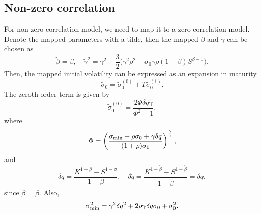 \documentclass[12pt]{article}
\begin{document}
  \subsection{Non-zero correlation}

    For non-zero correlation model, we need to map it to a zero correlation model. Denote the mapped parameters with a tilde,
    then the mapped $\beta$ and $\gamma$ can be chosen as
    \begin{equation}
      \tilde{\beta} = \beta, \quad
      \tilde{\gamma}^2 = \gamma^2 - \frac{3}{2}\bigg(\gamma^2\rho^2+\sigma_0\gamma\rho(1-\beta)S^{\beta-1}\bigg).
    \end{equation}
    Then, the mapped initial volatility can be expressed as an expansion in maturity
    \begin{equation}
      \tilde{\sigma}_0=\tilde{\sigma}_0^{(0)}+T\tilde{\sigma}_0^{(1)}.
    \end{equation}
    The zeroth order term is given by
    \begin{equation}
      \tilde{\sigma}_0^{(0)}=\frac{2\Phi\delta\tilde{q}\tilde{\gamma}}{\Phi^2-1},
    \end{equation}
    where
    \begin{equation}
      \Phi=\left(\frac{\sigma_{{\rm min}}+\rho\sigma_0+\gamma\delta q}{(1+\rho)\sigma_0}\right)^{\frac{\tilde{\gamma}}{\gamma}},
    \end{equation}
    and
    \begin{equation}
      \delta q = \frac{K^{1-\beta}-S^{1-\beta}}{1-\beta},\quad
      \delta \tilde{q} = \frac{K^{1-\tilde{\beta}}-S^{1-\tilde{\beta}}}{1-\tilde{\beta}} = \delta q,
    \end{equation}
    since $\tilde{\beta} = \beta$. Also,
    \begin{equation}
      \sigma_{{\rm min}}^2=\gamma^2\delta q^2+2\rho\gamma\delta q\sigma_0+\sigma_0^2.
    \end{equation}
\end{document}

